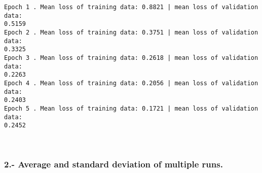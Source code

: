 \documentclass[11pt]{article}
\begin{document}
    \begin{Verbatim}[commandchars=\\\{\}]
Epoch 1 . Mean loss of training data: 0.8821 | mean loss of validation data:
0.5159
Epoch 2 . Mean loss of training data: 0.3751 | mean loss of validation data:
0.3325
Epoch 3 . Mean loss of training data: 0.2618 | mean loss of validation data:
0.2263
Epoch 4 . Mean loss of training data: 0.2056 | mean loss of validation data:
0.2403
Epoch 5 . Mean loss of training data: 0.1721 | mean loss of validation data:
0.2452
    \end{Verbatim}

    \begin{center}
    \end{center}
    { \hspace*{\fill} \\}
    
    \hypertarget{average-and-standard-deviation-of-multiple-runs.}{%
\subsubsection{2.- Average and standard deviation of multiple
runs.}\label{average-and-standard-deviation-of-multiple-runs.}}
\end{document}
